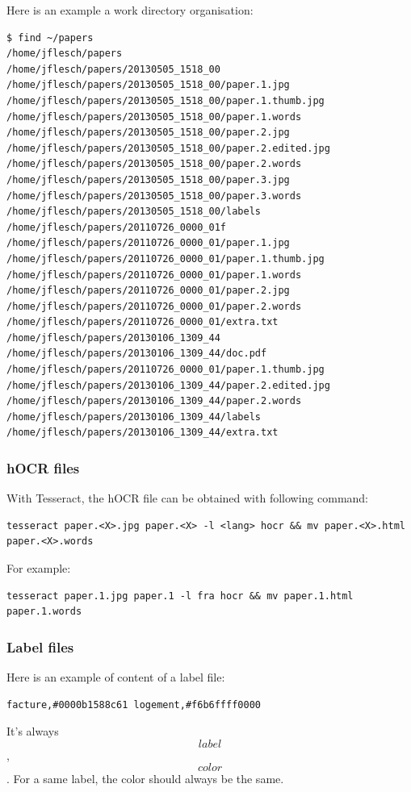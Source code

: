 \documentclass[10pt,a4paper]{article}
\begin{document}
Here is an example a work directory organisation:
\begin{verbatim}
$ find ~/papers
/home/jflesch/papers
/home/jflesch/papers/20130505_1518_00
/home/jflesch/papers/20130505_1518_00/paper.1.jpg
/home/jflesch/papers/20130505_1518_00/paper.1.thumb.jpg
/home/jflesch/papers/20130505_1518_00/paper.1.words
/home/jflesch/papers/20130505_1518_00/paper.2.jpg
/home/jflesch/papers/20130505_1518_00/paper.2.edited.jpg
/home/jflesch/papers/20130505_1518_00/paper.2.words
/home/jflesch/papers/20130505_1518_00/paper.3.jpg
/home/jflesch/papers/20130505_1518_00/paper.3.words
/home/jflesch/papers/20130505_1518_00/labels
/home/jflesch/papers/20110726_0000_01f
/home/jflesch/papers/20110726_0000_01/paper.1.jpg
/home/jflesch/papers/20110726_0000_01/paper.1.thumb.jpg
/home/jflesch/papers/20110726_0000_01/paper.1.words
/home/jflesch/papers/20110726_0000_01/paper.2.jpg
/home/jflesch/papers/20110726_0000_01/paper.2.words
/home/jflesch/papers/20110726_0000_01/extra.txt
/home/jflesch/papers/20130106_1309_44
/home/jflesch/papers/20130106_1309_44/doc.pdf
/home/jflesch/papers/20110726_0000_01/paper.1.thumb.jpg
/home/jflesch/papers/20130106_1309_44/paper.2.edited.jpg
/home/jflesch/papers/20130106_1309_44/paper.2.words
/home/jflesch/papers/20130106_1309_44/labels
/home/jflesch/papers/20130106_1309_44/extra.txt
\end{verbatim}

\subsubsection{hOCR files}

With Tesseract, the hOCR file can be obtained with following command:
\begin{verbatim}
tesseract paper.<X>.jpg paper.<X> -l <lang> hocr && mv paper.<X>.html paper.<X>.words
\end{verbatim}
For example:
\begin{verbatim}
tesseract paper.1.jpg paper.1 -l fra hocr && mv paper.1.html paper.1.words
\end{verbatim}

\subsubsection{Label files}

Here is an example of content of a label file:
\begin{verbatim}
facture,#0000b1588c61 logement,#f6b6ffff0000
\end{verbatim}
It's always \[label\],\[color\]. For a same label, the color should
always be the same.
\end{document}

